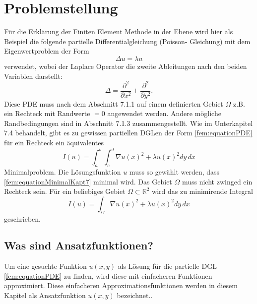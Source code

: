 %
%
%
\section{Problemstellung
\label{fem:section:problemstellung}}
Für die Erklärung der Finiten Element Methode in der Ebene wird hier als Beispiel die folgende partielle Differentialgleichung (Poisson- Gleichung) mit dem Eigenwertproblem der Form 
\begin{equation}
	\Delta u = \lambda u
	\label{fem:equationPDE}
\end{equation}
verwendet, wobei der Laplace Operator die zweite Ableitungen nach den beiden Variablen darstellt:
\begin{equation}
	\Delta = \frac{\partial ^2}{\partial x^2} + \frac{\partial ^2}{\partial y^2}.
\end{equation} 
Diese PDE muss nach dem Abschnitt 7.1.1 auf einem definierten Gebiet $\Omega$  z.B. ein Rechteck mit Randwerte $= 0$ angewendet werden. Andere mögliche Randbedingungen sind in Abschnitt 7.1.3 zusammengestellt. Wie im Unterkapitel 7.4 behandelt, gibt es zu gewissen partiellen DGLen der Form \eqref{fem:equationPDE} für ein Rechteck ein äquivalentes
\begin{equation}
	I(u) = \int_a^b \int_c^d \nabla u(x)^2 + \lambda u(x)^2 dy \, dx
	\label{fem:equationMinimalKapt7}
\end{equation}
Minimalproblem. Die Lösungsfunktion $u$ muss so gewählt werden, dass \eqref{fem:equationMinimalKapt7} minimal wird. Das Gebiet $\Omega$ muss nicht zwinged ein Rechteck sein. Für ein beliebiges Gebiet $\Omega \subset \mathbb{R}^2$ wird das zu minimirende Integral  %
\begin{equation}
	I(u) = \int_{\Omega} \nabla u(x)^2 + \lambda u(x)^2 dy \, dx
	\label{fem:equationMinimalKapt7Alg}
\end{equation}
geschrieben.
\subsection{Was sind Ansatzfunktionen?}
Um eine gesuchte Funktion $u(x,y)$ als Lösung für die partielle DGL \eqref{fem:equationPDE} zu finden, wird diese mit einfacheren Funktionen approximiert. Diese einfacheren Approximationsfunktionen werden in diesem Kapitel als Ansatzfunktion $u(x,y)$ bezeichnet..

